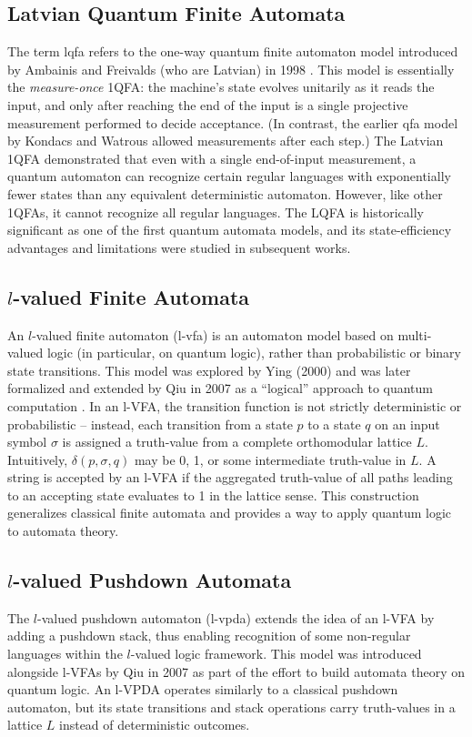 \subsection{Latvian Quantum Finite Automata} 
The term \gls{lqfa} refers to the one-way quantum finite automaton model introduced by Ambainis and Freivalds (who are Latvian) in 1998 \cite{ambainis19981}. This model is essentially the \emph{measure-once} 1QFA: the machine’s state evolves unitarily as it reads the input, and only after reaching the end of the input is a single projective measurement performed to decide acceptance. (In contrast, the earlier \gls{qfa} model by Kondacs and Watrous allowed measurements after each step.) The Latvian 1QFA demonstrated that even with a single end-of-input measurement, a quantum automaton can recognize certain regular languages with exponentially fewer states than any equivalent deterministic automaton. However, like other 1QFAs, it cannot recognize all regular languages. The LQFA is historically significant as one of the first quantum automata models, and its state-efficiency advantages and limitations were studied in subsequent works.

\subsection{\texorpdfstring{$l$}{l}-valued Finite Automata} 
An $l$-valued finite automaton (\gls{l-vfa}) is an automaton model based on multi-valued logic (in particular, on quantum logic), rather than probabilistic or binary state transitions. This model was explored by Ying (2000) and was later formalized and extended by Qiu in 2007 as a “logical” approach to quantum computation \cite{qiu2007automata}. In an l-VFA, the transition function is not strictly deterministic or probabilistic – instead, each transition from a state $p$ to a state $q$ on an input symbol $\sigma$ is assigned a truth-value from a complete orthomodular lattice $L$. Intuitively, $\delta(p,\sigma,q)$ may be 0, 1, or some intermediate truth-value in $L$. A string is accepted by an l-VFA if the aggregated truth-value of all paths leading to an accepting state evaluates to 1 in the lattice sense. This construction generalizes classical finite automata and provides a way to apply quantum logic to automata theory.

\subsection{\texorpdfstring{$l$}{l}-valued Pushdown Automata} 
The $l$-valued pushdown automaton (\gls{l-vpda}) extends the idea of an l-VFA by adding a pushdown stack, thus enabling recognition of some non-regular languages within the $l$-valued logic framework. This model was introduced alongside l-VFAs by Qiu in 2007 \cite{qiu2007automata} as part of the effort to build automata theory on quantum logic. An l-VPDA operates similarly to a classical pushdown automaton, but its state transitions and stack operations carry truth-values in a lattice $L$ instead of deterministic outcomes.

